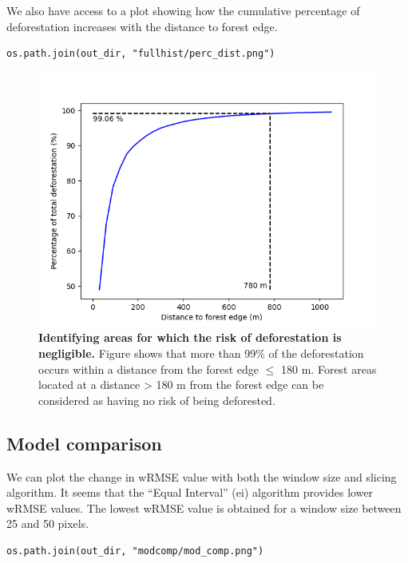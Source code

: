 \documentclass[paper=a4, 12pt, DIV=12]{scrartcl}
\begin{document}
We also have access to a plot showing how the cumulative percentage of deforestation increases with the distance to forest edge.

\begin{verbatim}
os.path.join(out_dir, "fullhist/perc_dist.png")
\end{verbatim}

\begin{figure}[H]
\centering
\includegraphics[width=0.8\linewidth]{outputs_kenya/fullhist/perc_dist.png}
\caption{\label{fig:orgc481f52}\textbf{Identifying areas for which the risk of deforestation is negligible.} Figure shows that more than 99\% of the deforestation occurs within a distance from the forest edge \(\leq\) 180 m. Forest areas located at a distance > 180 m from the forest edge can be considered as having no risk of being deforested.}
\end{figure}

\subsection{Model comparison}
\label{sec:orgcf703aa}

We can plot the change in wRMSE value with both the window size and slicing algorithm. It seems that the ``Equal Interval'' (ei) algorithm provides lower wRMSE values. The lowest wRMSE value is obtained for a window size between 25 and 50 pixels.

\begin{verbatim}
os.path.join(out_dir, "modcomp/mod_comp.png")
\end{verbatim}
\end{document}
